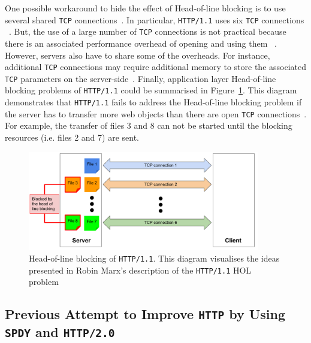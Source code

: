 \documentclass[12pt,a4paper]{report}
\begin{document}
One possible workaround to hide the effect of Head-of-line blocking is to use several shared \texttt{TCP} connections~\cite{bib_digital_ocean_http11_vs_http2}.
In particular, \texttt{HTTP/1.1} uses six \texttt{TCP} connections ~\cite{bib_will-http2-make-my-site-faster, head-of-line-blocking-in-quic-and-http-3-the-details}.
But, the use of a large number of \texttt{TCP} connections is not practical because there is an associated performance overhead of opening and using them ~\cite{bib_digital_ocean_http11_vs_http2, head-of-line-blocking-in-quic-and-http-3-the-details}.
However, servers also have to share some of the overheads.
For instance, additional \texttt{TCP} connections may require additional memory to store the associated \texttt{TCP} parameters on the server-side~\cite{head-of-line-blocking-in-quic-and-http-3-the-details}.
Finally, application layer Head-of-line blocking problems of \texttt{HTTP/1.1} could be summarised in Figure~\ref{fig:Head_of_line_blocking_of_HTTP1_1}.
This diagram demonstrates that \texttt{HTTP/1.1} fails to address the Head-of-line blocking problem if the server has to transfer more web objects than there are open \texttt{TCP} connections~\cite{head-of-line-blocking-in-quic-and-http-3-the-details}.
For example, the transfer of files 3 and 8 can not be started until the blocking resources (i.e. files 2 and 7) are sent. 

    \begin{figure}[H]
    \centering
    \includegraphics[width=0.9\textwidth]{figs/Head_of_line_blocking_of_HTTP1_1.png}
    \caption[Head-of-line blocking of \texttt{HTTP/1.1}]{Head-of-line blocking of \texttt{HTTP/1.1}. This diagram visualises the ideas presented in Robin Marx's description of the \texttt{HTTP/1.1} HOL problem~\cite{head-of-line-blocking-in-quic-and-http-3-the-details}}
    \label{fig:Head_of_line_blocking_of_HTTP1_1}
    \end{figure}





\subsection{Previous Attempt to Improve \texttt{HTTP} by Using \texttt{SPDY} and \texttt{HTTP/2.0}} \label{Previous_attempt_to_improve_http_by_using_SPDY_and_HTTP2}
\end{document}
